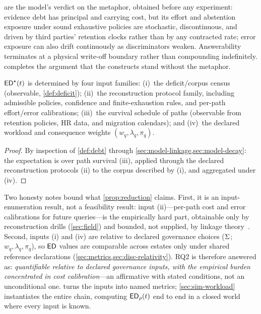 \label{sec:model-anti}
 are the model's verdict on the metaphor, obtained
before any experiment: evidence debt has principal and carrying cost, but its
effort and abstention exposure under sound exhaustive policies are stochastic,
discontinuous, and driven by third
parties' retention clocks rather than by any contracted rate; error exposure can
also drift continuously as discriminators weaken. Answerability terminates at a
physical write-off boundary rather than compounding indefinitely.
 completes the
argument that the constructs stand without the metaphor.

\begin{proposition}
\label{prop:reduction}
$\mathsf{ED}^{\star}(t)$ is determined by four input families: (i)~the deficit/corpus census
(observable, \cref{def:deficit}); (ii)~the reconstruction protocol family,
including admissible policies, confidence and finite-exhaustion rules, and
per-path effort/error calibrations; (iii)~the survival schedule of paths
(observable from retention policies, HR data, and migration calendars); and
(iv)~the declared workload and consequence weights $(w_q,\lambda_q,\pi_q)$.
\end{proposition}
\begin{proof}
By inspection of \cref{def:debt} through \cref{sec:model-linkage,sec:model-decay}:
the expectation is over path survival (iii), applied through the declared
reconstruction protocols (ii) to the corpus described by (i), and aggregated
under (iv).
\end{proof}

Two honesty notes bound what \cref{prop:reduction} claims. First, it is an
input-enumeration result, not a feasibility result: input (ii)---per-path cost and
error calibrations for future queries---is the empirically hard part, obtainable
only by reconstruction drills (\cref{sec:field}) and bounded, not supplied, by
linkage theory~\cite{fellegi1969}. Second, inputs (i) and (iv) are relative to
declared governance choices ($\Sigma$; $w_q, \lambda_q, \pi_q$), so $\mathsf{ED}$ values are
comparable across estates only under shared reference declarations
(\cref{sec:metrics,sec:disc-relativity}). RQ2 is therefore answered as:
\emph{quantifiable relative to declared governance inputs, with the empirical
burden concentrated in cost calibration}---an affirmative with stated conditions,
not an unconditional one.  turns the inputs into named metrics;
\cref{sec:sim-workload} instantiates the entire chain, computing $\mathsf{ED}_\rho(t)$ end to end in
a closed world where every input is known.
